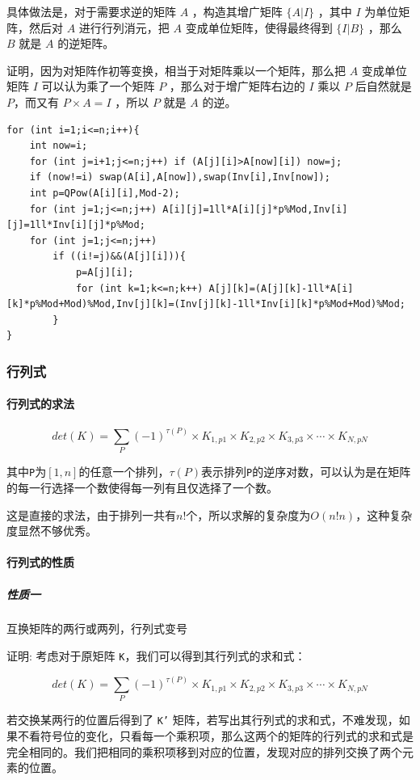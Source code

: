 \documentclass[UTF-8]{ctexart}
\begin{document}
	具体做法是，对于需要求逆的矩阵 $A$ ，构造其增广矩阵 $\{A|I\}$ ，其中 $I$ 为单位矩阵，然后对 $A$ 进行行列消元，把 $A$ 变成单位矩阵，使得最终得到 $\{I|B\}$ ，那么 $B$ 就是 $A$ 的逆矩阵。
	
	证明，因为对矩阵作初等变换，相当于对矩阵乘以一个矩阵，那么把 $A$ 变成单位矩阵 $I$ 可以认为乘了一个矩阵 $P$ ，那么对于增广矩阵右边的 $I$ 乘以 $P$ 后自然就是 $P$，而又有 $P\times A=I$ ，所以 $P$ 就是 $A$ 的逆。
	
\begin{verbatim}
for (int i=1;i<=n;i++){
    int now=i;
    for (int j=i+1;j<=n;j++) if (A[j][i]>A[now][i]) now=j;
    if (now!=i) swap(A[i],A[now]),swap(Inv[i],Inv[now]);
    int p=QPow(A[i][i],Mod-2);
    for (int j=1;j<=n;j++) A[i][j]=1ll*A[i][j]*p%Mod,Inv[i][j]=1ll*Inv[i][j]*p%Mod;
    for (int j=1;j<=n;j++)
        if ((i!=j)&&(A[j][i])){
            p=A[j][i];
            for (int k=1;k<=n;k++) A[j][k]=(A[j][k]-1ll*A[i][k]*p%Mod+Mod)%Mod,Inv[j][k]=(Inv[j][k]-1ll*Inv[i][k]*p%Mod+Mod)%Mod;
        }
}
\end{verbatim}
	\subsubsection{行列式}
	\paragraph{行列式的求法}
	$$det(K)=\sum _ {P}{(-1)}^{\tau{(P)}}\times{K} _ {1,p1}\times{K} _  {2,p2}\times{K}  _ {3,p3}\times\cdots\times{K} _ {N,pN}$$
	
	其中\texttt{P}为$[1,n]$的任意一个排列，$\tau(P)$表示排列\texttt{P}的逆序对数，可以认为是在矩阵的每一行选择一个数使得每一列有且仅选择了一个数。
	  
	这是直接的求法，由于排列一共有$n!$个，所以求解的复杂度为$O(n!n)$，这种复杂度显然不够优秀。
	
	\paragraph{行列式的性质}
	\subparagraph{性质一} 互换矩阵的两行或两列，行列式变号
	
	证明:	考虑对于原矩阵 \texttt{K}，我们可以得到其行列式的求和式：  
	
	$$det(K)=\sum _ {P}{(-1)}^{\tau{(P)}}\times{K} _ {1,p1}\times{K} _ {2,p2}\times{K} _ {3,p3}\times\cdots\times{K} _ {N,pN}$$
	
	若交换某两行的位置后得到了 \texttt{K'} 矩阵，若写出其行列式的求和式，不难发现，如果不看符号位的变化，只看每一个乘积项，那么这两个的矩阵的行列式的求和式是完全相同的。我们把相同的乘积项移到对应的位置，发现对应的排列交换了两个元素的位置。
	
\end{document}
